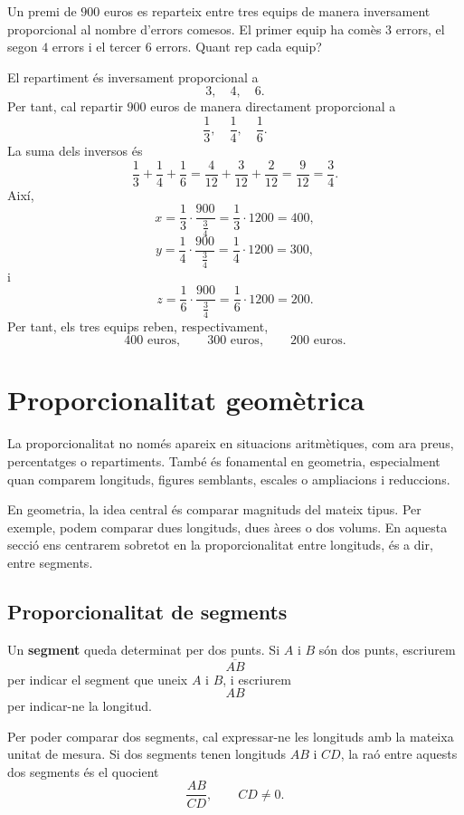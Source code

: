 \begin{exemple}
Un premi de \(900\) euros es reparteix entre tres equips de manera inversament proporcional al nombre d'errors comesos. El primer equip ha comès \(3\) errors, el segon \(4\) errors i el tercer \(6\) errors. Quant rep cada equip?
\end{exemple}

\begin{solucio}
El repartiment és inversament proporcional a
\[
	3,\quad 4,\quad 6.
\]
Per tant, cal repartir \(900\) euros de manera directament proporcional a
\[
	\frac{1}{3},\quad \frac{1}{4},\quad \frac{1}{6}.
\]
La suma dels inversos és
\[
	\frac{1}{3}+\frac{1}{4}+\frac{1}{6}
	=
	\frac{4}{12}+\frac{3}{12}+\frac{2}{12}
	=
	\frac{9}{12}
	=
	\frac{3}{4}.
\]
Així,
\[
	x=
	\frac{1}{3}\cdot\frac{900}{\frac{3}{4}}
	=
	\frac{1}{3}\cdot 1200
	=
	400,
\]
\[
	y=
	\frac{1}{4}\cdot\frac{900}{\frac{3}{4}}
	=
	\frac{1}{4}\cdot 1200
	=
	300,
\]
i
\[
	z=
	\frac{1}{6}\cdot\frac{900}{\frac{3}{4}}
	=
	\frac{1}{6}\cdot 1200
	=
	200.
\]
Per tant, els tres equips reben, respectivament,
\[
	400\text{ euros},\qquad 300\text{ euros},\qquad 200\text{ euros}.
\]
\end{solucio}

\section{Proporcionalitat geomètrica}

La proporcionalitat no només apareix en situacions aritmètiques, com ara preus, percentatges o repartiments. També és fonamental en geometria, especialment quan comparem longituds, figures semblants, escales o ampliacions i reduccions.

En geometria, la idea central és comparar magnituds del mateix tipus. Per exemple, podem comparar dues longituds, dues àrees o dos volums. En aquesta secció ens centrarem sobretot en la proporcionalitat entre longituds, és a dir, entre segments.

\subsection{Proporcionalitat de segments}

Un \textbf{segment} queda determinat per dos punts. Si \(A\) i \(B\) són dos punts, escriurem
\[
	\overline{AB}
\]
per indicar el segment que uneix \(A\) i \(B\), i escriurem
\[
	AB
\]
per indicar-ne la longitud.

Per poder comparar dos segments, cal expressar-ne les longituds amb la mateixa unitat de mesura. Si dos segments tenen longituds \(AB\) i \(CD\), la raó entre aquests dos segments és el quocient
\[
	\frac{AB}{CD},
	\qquad CD\neq 0.
\]

